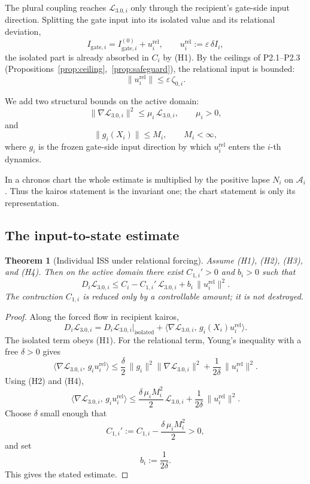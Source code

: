 \documentclass[11pt,a4paper]{article}
\theoremstyle{definition}
\theoremstyle{plain}
\newtheorem{theorem}[definition]{Theorem}
\theoremstyle{remark}
\begin{document}
The plural coupling reaches \(\mathcal L_{3.0,i}\) only through the recipient's
gate-side input direction. Splitting the gate input into its isolated value and its
relational deviation,
\[
I_{\mathrm{gate},i}
=
I_{\mathrm{gate},i}^{(0)}
+
u_i^{\mathrm{rel}},
\qquad
u_i^{\mathrm{rel}}:=\varepsilon\,\delta I_i,
\]
the isolated part is already absorbed in \(C_i\) by (H1). By the ceilings of
P2.1--P2.3 (Propositions~\ref{prop:ceiling},~\ref{prop:safeguard}), the relational
input is bounded:
\[
\lVert u_i^{\mathrm{rel}}\rVert
\le
\varepsilon\,\zeta_{0,i}.
\tag{H3}
\]

We add two structural bounds on the active domain:
\[
\lVert\nabla\mathcal L_{3.0,i}\rVert^2
\le
\mu_i\,\mathcal L_{3.0,i},
\qquad
\mu_i>0,
\tag{H2}
\]
and
\[
\lVert g_i(X_i)\rVert
\le
M_i,
\qquad
M_i<\infty,
\tag{H4}
\]
where \(g_i\) is the frozen gate-side input direction by which
\(u_i^{\mathrm{rel}}\) enters the \(i\)-th dynamics.

In a chronos chart the whole estimate is multiplied by the positive lapse \(N_i\)
on \(\mathcal A_i\). Thus the kairos statement is the invariant one; the chart
statement is only its representation.

\subsection{The input-to-state estimate}

\begin{theorem}[Individual ISS under relational forcing]\label{thm:iss}
Assume \textup{(H1)}, \textup{(H2)}, \textup{(H3)}, and \textup{(H4)}. Then on the
active domain there exist \(C_{1,i}'>0\) and \(b_i>0\) such that
\[
\boxed{\;
D_i\mathcal L_{3.0,i}
\le
C_i-C_{1,i}'\,\mathcal L_{3.0,i}
+
b_i\,\lVert u_i^{\mathrm{rel}}\rVert^2.
\;}
\]
The contraction \(C_{1,i}\) is reduced only by a controllable amount; it is not
destroyed.
\end{theorem}

\begin{proof}
Along the forced flow in recipient kairos,
\[
D_i\mathcal L_{3.0,i}
=
D_i\mathcal L_{3.0,i}\big|_{\mathrm{isolated}}
+
\bigl\langle
\nabla\mathcal L_{3.0,i},\,
g_i(X_i)u_i^{\mathrm{rel}}
\bigr\rangle.
\]
The isolated term obeys (H1). For the relational term, Young's inequality with a
free \(\delta>0\) gives
\[
\bigl\langle
\nabla\mathcal L_{3.0,i},\,
g_i u_i^{\mathrm{rel}}
\bigr\rangle
\le
\frac{\delta}{2}\,\lVert g_i\rVert^2
\lVert\nabla\mathcal L_{3.0,i}\rVert^2
+
\frac{1}{2\delta}\,\lVert u_i^{\mathrm{rel}}\rVert^2.
\]
Using (H2) and (H4),
\[
\bigl\langle
\nabla\mathcal L_{3.0,i},\,
g_i u_i^{\mathrm{rel}}
\bigr\rangle
\le
\frac{\delta\,\mu_iM_i^2}{2}\,\mathcal L_{3.0,i}
+
\frac{1}{2\delta}\,\lVert u_i^{\mathrm{rel}}\rVert^2.
\]
Choose \(\delta\) small enough that
\[
C_{1,i}'
:=
C_{1,i}-\frac{\delta\,\mu_iM_i^2}{2}
>0,
\]
and set
\[
b_i:=\frac{1}{2\delta}.
\]
This gives the stated estimate. \qedhere
\end{proof}
\end{document}
